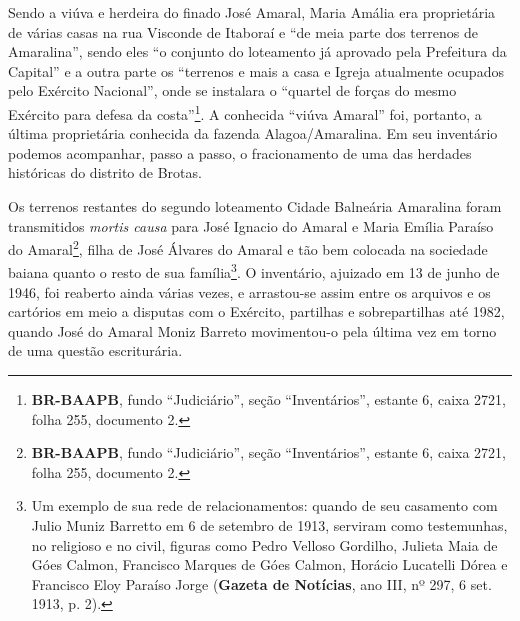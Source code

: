 Sendo a viúva e herdeira do finado José Amaral, Maria Amália era proprietária de várias casas na rua Visconde de Itaboraí e ``de meia parte dos terrenos de Amaralina'', sendo eles ``o conjunto do loteamento já aprovado pela Prefeitura da Capital'' e a outra parte os ``terrenos e mais a casa e Igreja atualmente ocupados pelo Exército Nacional'', onde se instalara o ``quartel de forças do mesmo Exército para defesa da costa''\footnote{\textbf{BR-BAAPB}, fundo ``Judiciário'', seção ``Inventários'', estante 6, caixa 2721, folha 255, documento 2.}. A conhecida ``viúva Amaral'' foi, portanto, a última proprietária conhecida da fazenda Alagoa/Amaralina. Em seu inventário podemos acompanhar, passo a passo, o fracionamento de uma das herdades históricas do distrito de Brotas. 

Os terrenos restantes do segundo loteamento Cidade Balneária Amaralina foram transmitidos \textit{mortis causa} para José Ignacio do Amaral e Maria Emília Paraíso do Amaral\footnote{\textbf{BR-BAAPB}, fundo ``Judiciário'', seção ``Inventários'', estante 6, caixa 2721, folha 255, documento 2.}, filha de
José Álvares do Amaral e tão bem colocada na sociedade baiana quanto o resto de sua família\footnote{Um exemplo de sua rede de relacionamentos: quando de seu casamento com Julio Muniz Barretto em 6 de setembro de 1913, serviram como testemunhas, no religioso e no civil, figuras como Pedro Velloso Gordilho, Julieta Maia de Góes Calmon, Francisco Marques de Góes Calmon, Horácio Lucatelli Dórea e Francisco Eloy Paraíso Jorge (\textbf{Gazeta de Notícias}, ano III, nº 297, 6 set. 1913, p. 2).}. O inventário, ajuizado em 13 de junho de 1946, foi reaberto ainda várias vezes, e arrastou-se assim entre os arquivos e os cartórios em meio a disputas com o Exército, partilhas e sobrepartilhas até 1982, quando José do Amaral Moniz Barreto movimentou-o pela última vez em torno de uma questão escriturária.

